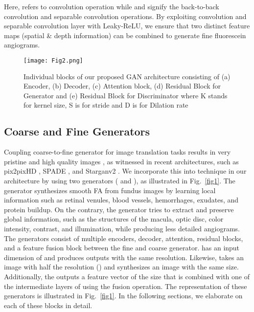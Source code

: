 \documentclass[a4paper,conference]{IEEEtran}
\begin{document}
Here,  refers to convolution operation while  and  signify the back-to-back convolution and separable convolution operations. By exploiting convolution and separable convolution layer with Leaky-ReLU, we ensure that two distinct feature maps (spatial \& depth information) can be combined to generate fine fluorescein angiograms. 


\fi


\begin{figure}[htb]
    \centering
    \texttt{[image: Fig2.png]}
    \caption{Individual blocks of our proposed GAN architecture consisting of (a) Encoder, (b) Decoder, (c) Attention block, (d) Residual Block for Generator and (e) Residual Block for Discriminator where K stands for kernel size, S is for stride  and D is for Dilation rate }\label{fig2}
\end{figure}

\subsection{Coarse and Fine Generators}
\label{subsec:generators}
Coupling coarse-to-fine generator for image translation tasks results in very pristine and high quality images , as witnessed in recent architectures, such as pix2pixHD \cite{wang2018high}, SPADE \cite{park2019semantic}, and Starganv2 \cite{choi2020stargan}. We incorporate this into technique in our architecture by using two generators ( and ), as illustrated in Fig.~\ref{fig1}. The generator  synthesizes smooth FA from fundus images by learning local information such as retinal venules, blood vessels, hemorrhages, exudates, and protein buildup. On the contrary, the generator  tries to extract and preserve global information, such as the structures of the macula, optic disc, color intensity, contrast, and illumination, while producing less detailed angiograms. The generators consist of multiple encoders, decoder, attention, residual blocks, and a feature fusion block between the fine and coarse generator.   has an input dimension of   and produces outputs with the same resolution. Likewise,  takes an image with half the resolution () and synthesizes an image with the same size. Additionally, the  outputs a feature vector of the size  that is combined with one of the intermediate layers of  using the fusion operation. The representation of these generators is illustrated in Fig.~\ref{fig1}. In the following sections, we elaborate on each of these blocks in detail.
\end{document}
